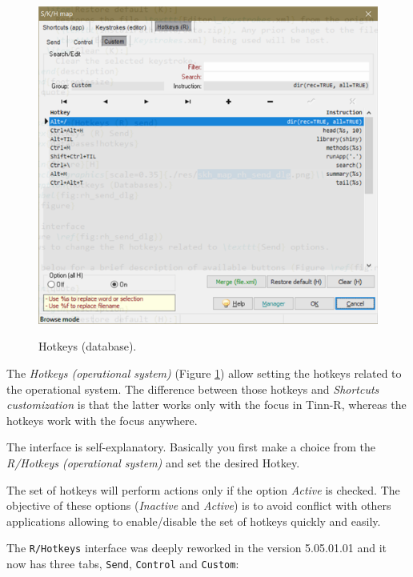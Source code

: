 \begin{figure}[H]
  \includegraphics[scale=0.35]{./res/dlg_skh_map_rh_custom.png}\\
  \caption{Hotkeys (database).}
  \label{fig:dlg_skh_map_hotkeys}
\end{figure}

The \textit{Hotkeys (operational system)}
(Figure \ref{fig:dlg_skh_map_hotkeys})
allow setting the hotkeys
related to the operational system. The difference between those hotkeys and
\textit{Shortcuts customization} is that the latter works only with the
focus in Tinn-R, whereas the hotkeys work with the focus anywhere.

The interface is self-explanatory. Basically you first make a choice from
the \textit{R/Hotkeys (operational system)} and set the desired Hotkey.

The set of hotkeys will perform actions only if the option \textit{Active}
is checked. The objective of these options (\textit{Inactive} and
\textit{Active}) is to avoid conflict with others applications allowing
to enable/disable the set of hotkeys quickly and easily.

The \texttt{R/Hotkeys} interface was deeply reworked in the version 5.05.01.01 and it now has three tabs,
\texttt{Send}, \texttt{Control} and \texttt{Custom}:

